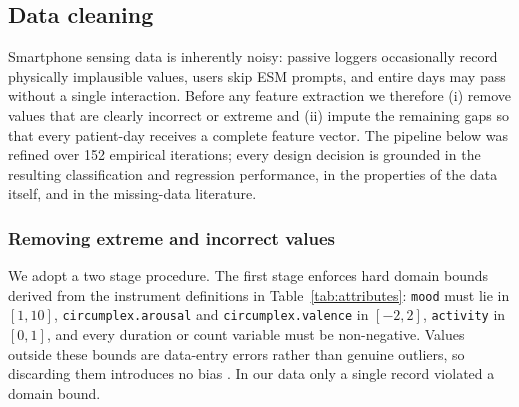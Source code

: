 
\subsection{Data cleaning}\label{sec:data-cleaning}

Smartphone sensing data is inherently noisy: passive loggers occasionally record physically implausible values, users skip ESM prompts, and entire days may pass without a single interaction. Before any feature extraction we therefore (i) remove values that are clearly incorrect or extreme and (ii) impute the remaining gaps so that every patient-day receives a complete feature vector. The pipeline below was refined over 152 empirical iterations; every design decision is grounded in the resulting classification and regression performance, in the properties of the data itself, and in the missing-data literature.

\subsubsection{Removing extreme and incorrect values}

We adopt a two stage procedure. The first stage enforces hard domain bounds derived from the instrument definitions in Table~\ref{tab:attributes}: \texttt{mood} must lie in $[1,10]$, \texttt{circumplex.arousal} and \texttt{circumplex.valence} in $[-2,2]$, \texttt{activity} in $[0,1]$, and every duration or count variable must be non-negative. Values outside these bounds are data-entry errors rather than genuine outliers, so discarding them introduces no bias \cite{little2019statistical}. In our data only a single record violated a domain bound.

